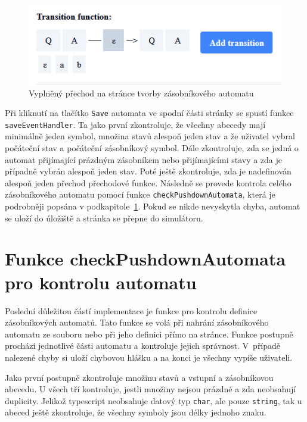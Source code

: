 \begin{figure}[h]
    \centering
    \includegraphics{Figures/PrntScrn_FilledTransition.png}
    \caption{Vyplněný přechod na stránce tvorby zásobníkového automatu}\label{fig:FilledTransition}
\end{figure}

Při kliknutí na tlačítko \texttt{Save} automata ve spodní části stránky se spustí funkce \texttt{saveEventHandler}. Ta jako první zkontroluje, že všechny abecedy mají minimálně jeden symbol, množina stavů alespoň jeden stav a že uživatel vybral počáteční stav a počáteční zásobníkový symbol. Dále zkontroluje, zda se jedná o automat přijímající prázdným zásobníkem nebo přijímajícími stavy a zda je případně vybrán alespoň jeden stav. Poté ještě zkontroluje, zda je nadefinován alespoň jeden přechod přechodové funkce. Následně se provede kontrola celého zásobníkového automatu pomocí funkce \texttt{checkPushdownAutomata}, která je podrobněji popsána v podkapitole~\ref{sec:checkPushdownAutomata}. Pokud se nikde nevyskytla chyba, automat se uloží do úložiště a stránka se přepne do simulátoru.

\section{Funkce checkPushdownAutomata pro kontrolu automatu}\label{sec:checkPushdownAutomata}

Poslední důležitou částí implementace je funkce pro kontrolu definice zásobníkových automatů. Tato funkce se volá při nahrání zásobníkového automatu ze souboru nebo při jeho definici přímo na stránce. Funkce postupně prochází jednotlivé části automatu a kontroluje jejich správnost. V~případě nalezené chyby si uloží chybovou hlášku a na konci je všechny vypíše uživateli.

Jako první postupně zkontroluje množinu stavů a vstupní a zásobníkovou abecedu. U všech tří kontroluje, jestli množiny nejsou prázdné a zda neobsahují duplicity. Jelikož typescript neobsahuje datový typ \texttt{char}, ale pouze \texttt{string}, tak u abeced ještě zkontroluje, že všechny symboly jsou délky jednoho znaku.

